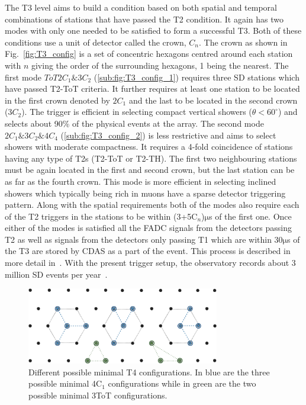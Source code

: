 The T3 level aims to build a condition based on both spatial and temporal combinations of stations that have passed the T2 condition. It again has two modes with only one needed to be satisfied to form a successful T3. Both of these conditions use a unit of detector called the crown, $C_n$. The crown as shown in Fig.~\ref{fig:T3_config} is a set of concentric hexagons centred around each station with $n$ giving the order of the surrounding hexagons, 1 being the nearest. The first mode $ToT2C_1\&3C_2$ (\ref{sub:fig:T3_config_1}) requires three SD stations which have passed T2-ToT criteria. It further requires at least one station to be located in the first crown denoted by $2C_1$ and the last to be located in the second crown ($3C_2$). The trigger is efficient in selecting compact vertical showers ($\theta < 60^{\circ}$) and selects about 90\% of the physical events at the array. The second mode $2C_1\&3C_2\&4C_4$ (\ref{sub:fig:T3_config_2}) is less restrictive and aims to select showers with moderate compactness. It requires a 4-fold coincidence of stations having any type of T2s (T2-ToT or T2-TH). The first two neighbouring stations must be again located in the first and second crown, but the last station can be as far as the fourth crown. This mode is more efficient in selecting inclined showers which typically being rich in muons have a sparse detector triggering pattern. Along with the spatial requirements both of the modes also require each of the T2 triggers in the stations to be within (3+5C$_n$)$\mathrm{\mu}$s of the first one. Once either of the modes is satisfied all the FADC signals from the detectors passing T2 as well as signals from the detectors only passing T1 which are within 30$\mathrm{\mu}$s of the T3 are stored by CDAS as a part of the event. This process is described in more detail in~\cite{Auger:2015}. With the present trigger setup, the observatory records about 3 million SD events per year~\cite{Auger:2015}. 


\begin{figure}[t!]
  \centering
  \includegraphics[width=0.75\textwidth]{thesis_figures/Setup/T4_modes.png}
  \caption{Different possible minimal T4 configurations. In blue are the three possible minimal 4C$_1$ configurations while in green are the two possible minimal 3ToT configurations.}
  \label{fig:T4_config}
\end{figure}



